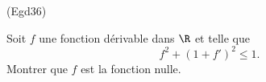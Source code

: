 \begin{tiny}(Egd36)\end{tiny} Soit $f$ une fonction dérivable dans $\R$ et telle que
\[
  f^2 + (1+f')^2 \leq 1.
\]
Montrer que $f$ est la fonction nulle.
